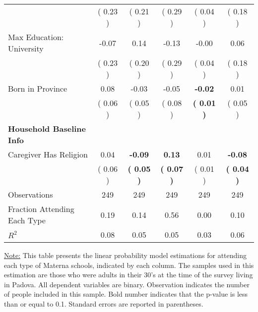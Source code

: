 \begin{table}[H]
{\begin{tabular}{lccccc}
\quad  & (     0.23 ) & (     0.21 )  & (     0.29 )  & (     0.04 ) & (     0.18 ) \\
\quad Max Education: University &     -0.07 &      0.14 &     -0.13 &     -0.00 &      0.06 \\
\quad  & (     0.23 ) & (     0.20 )  & (     0.29 )  & (     0.04 ) & (     0.18 ) \\
\quad Born in Province &      0.08 &     -0.03 &     -0.05 & \textbf{    -0.02} &      0.01 \\
\quad  & (     0.06 ) & (     0.05 )  & (     0.08 )  & \textbf{(     0.01 )} & (     0.05 ) \\
\midrule
\textbf{Household Baseline Info} \\
\quad Caregiver Has Religion &      0.04 & \textbf{    -0.09} & \textbf{     0.13} &      0.01 & \textbf{    -0.08} \\
\quad  & (     0.06 ) & \textbf{(     0.05 )}  & \textbf{(     0.07 )}  & (     0.01 ) & \textbf{(     0.04 )} \\
\midrule
Observations & 249 & 249 & 249 & 249 & 249 \\
Fraction Attending Each Type &      0.19 &      0.14 &      0.56 &      0.00 &      0.10 \\
\midrule
$ R^2$ &      0.08 &      0.05 &      0.05 &      0.03 &      0.06 \\
\bottomrule
\end{tabular}}
\end{table}
\begin{scriptsize}
\noindent\underline{Note:} This table presents the linear probability model estimations for attending each type of Materna schools, indicated by each column. The samples used in this estimation are those who were adults in their 30's at the time of the survey living in Padova. All dependent variables are binary. Observation indicates the number of people included in this sample. Bold number indicates that the p-value is less than or equal to 0.1. Standard errors are reported in parentheses.
\end{scriptsize}
